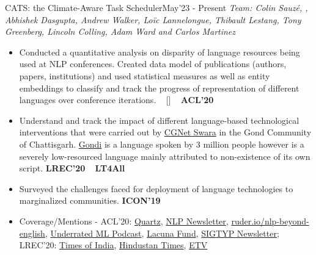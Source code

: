 \begin{projects}
\project
	{CATS: the Climate-Aware Task Scheduler}{May'23 - Present}
	{
	     \textit{Team: Colin Sauzé, \underline{}, Abhishek Dasgupta, Andrew Walker, Loïc Lannelongue, Thibault Lestang, Tony Greenberg, Lincoln Colling, Adam Ward and Carlos Martinez}
	}
	{\begin{itemize}
	\setlength\itemsep{0.3em}
     \item Conducted a quantitative analysis on disparity of language resources being used at NLP conferences. Created data model of publications (authors, papers, institutions) and used statistical measures as well as entity embeddings to classify and track the progress of representation of different languages over conference iterations. ~ [\href{https://microsoft.github.io/linguisticdiversity/}{\small{\websiteSymbol}}]  ~  {\small{\lbrack\textbf{{ACL'20}}\rbrack}}
     \item Understand and track the impact of different language-based technological interventions that were carried out by \href{http://cgnetswara.org/}{CGNet Swara} in the Gond Community of Chattisgarh. \href{https://en.wikipedia.org/wiki/Gondi_language}{Gondi} is a language spoken by 3 million people however is a severely low-resourced language mainly attributed to non-existence of its own script. {\small{\lbrack\textbf{{LREC'20}}\rbrack}} ~ {\small{\lbrack\textbf{{LT4All}}\rbrack}}
     \item Surveyed the challenges faced for deployment of language technologies to marginalized communities. {\small{\lbrack\textbf{{ICON'19}}\rbrack}}
     \item Coverage/Mentions - {ACL'20}: \href{https://qz.com/1920191/internet-translation-access-creates-a-powerful-digital-divide/}{Quartz},  \href{http://newsletter.ruder.io/issues/reviewing-taking-stock-theme-papers-poisoning-and-stealing-models-multimodal-generation-240687}{NLP Newsletter}, \href{https://ruder.io/nlp-beyond-english/}{ruder.io/nlp-beyond-english}, \href{https://www.underratedml.com/episodes/episode-05-language-independence-and-material-properties}{Underrated ML Podcast}, \href{https://lacunafund.org/language/}{Lacuna Fund}, \href{https://sigtyp.github.io/sigtyp-newsletter-Apr-2020.html}{SIGTYP Newsletter}; {LREC'20}: \href{http://toi.in/HcX74b/a31g}{Times of India}, \href{https://www.hindustantimes.com/india-news/gonds-in-chhattisgarh-get-app-for-news-in-their-language/story-uQEDqDGBIPty7rMCNskTsK.html}{Hindustan Times}, \href{https://www.etvbharat.com/hindi/chhattisgarh/state/raipur/now-tribal-can-hear-news-and-stories-in-their-language/ct20190802191729141}{ETV}
     \end{itemize}}


\end{projects}
